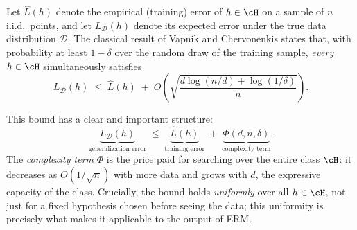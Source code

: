 Let $\hat{L}(h)$ denote the empirical (training) error of $h \in \cH$ on a sample of $n$
i.i.d.\ points, and let $L_{\mathcal{D}}(h)$ denote its expected error under the true data
distribution $\mathcal{D}$. The classical result of Vapnik and Chervonenkis states that, with
probability at least $1-\delta$ over the random draw of the training sample, \emph{every}
$h \in \cH$ simultaneously satisfies
\begin{equation}
\label{eq:vcbound}
L_{\mathcal{D}}(h) \;\le\; \hat{L}(h) \;+\;
O\!\left(\sqrt{\frac{d\log(n/d) + \log(1/\delta)}{n}}\right).
\end{equation}

This bound has a clear and important structure:
\[
\underbrace{L_{\mathcal{D}}(h)}_{\text{generalization error}}
\;\le\;
\underbrace{\hat{L}(h)}_{\text{training error}}
\;+\;
\underbrace{\Phi(d,n,\delta)}_{\text{complexity term}}.
\]
The \emph{complexity term} $\Phi$ is the price paid for searching over the entire class $\cH$:
it decreases as $O(1/\sqrt{n})$ with more data and grows with $d$, the expressive capacity
of the class. Crucially, the bound holds \emph{uniformly} over all $h \in \cH$, not just for
a fixed hypothesis chosen before seeing the data; this uniformity is precisely what makes it
applicable to the output of ERM.

